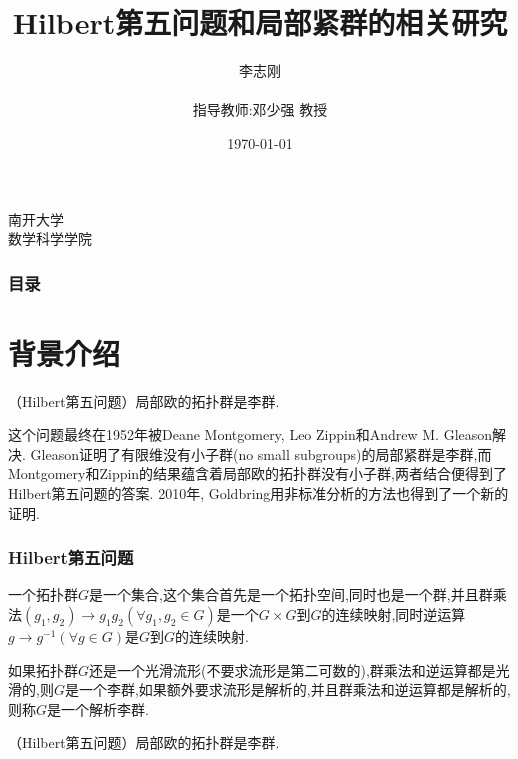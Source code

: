 \documentclass[aspectratio=169, 10pt, utf8, mathserif]{beamer}
\begin{document}

\title{Hilbert第五问题和局部紧群的相关研究}

\author{李志刚 \\ \quad \\ 指导教师:邓少强 教授}
\institute
{
	南开大学 \\
	数学科学学院
}
\date{\today}
\begin{frame}
    \titlepage
\end{frame}

\begin{frame}
	\frametitle{目录}
	\tableofcontents[hideallsubsections]
\end{frame}

\section{背景介绍}

\begin{frame}[plain]
	\begin{Theorem}
		（Hilbert第五问题）局部欧的拓扑群是李群.
	\end{Theorem}
	这个问题最终在1952年被Deane Montgomery, Leo Zippin和Andrew M. Gleason解决. Gleason证明了有限维没有小子群(no small subgroups)的局部紧群是李群,而Montgomery和Zippin的结果蕴含着局部欧的拓扑群没有小子群,两者结合便得到了Hilbert第五问题的答案. 2010年, Goldbring用非标准分析的方法也得到了一个新的证明.
\end{frame}

\begin{frame}[plain]
	\frametitle{Hilbert第五问题}
	\begin{Definition}
		一个拓扑群$G$是一个集合,这个集合首先是一个拓扑空间,同时也是一个群,并且群乘法$(g_1,g_2)\to g_1g_2(\forall g_1,g_2\in G)$是一个$G \times G$到$G$的连续映射,同时逆运算$g\to g^{-1}(\forall g\in G)$是$G$到$G$的连续映射.
	\end{Definition}

	如果拓扑群$G$还是一个光滑流形(不要求流形是第二可数的),群乘法和逆运算都是光滑的,则$G$是一个李群,如果额外要求流形是解析的,并且群乘法和逆运算都是解析的,则称$G$是一个解析李群.

	\begin{Theorem}
		（Hilbert第五问题）局部欧的拓扑群是李群.
	\end{Theorem}
	
\end{frame}
\end{document}
